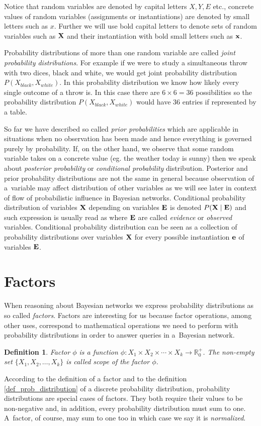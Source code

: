 \documentclass[english,cover]{fitthesis} %
\newtheorem{math_def}{Definition}[chapter] %
\newcommand{\term}[1]{\emph{#1}}           %
\newcommand{\vars}[1]{{\bold{#1}}}         %
\begin{document}
Notice that random variables are denoted by capital letters $X, Y, E$ etc., concrete values of random variables (assignments or instantiations) are denoted by small letters such as $x$. Further we will use bold capital letters to denote sets of random variables such as $\vars{X}$ and their instantiation with bold small letters such as $\vars{x}$.

Probability distributions of more than one random variable are called \term{joint probability distributions}. For example if we were to study a simultaneous throw with two dices, black and white, we would get joint probability distribution $P(X_{black},X_{white})$. In this probability distribution we know how likely every single outcome of a throw is. In this case there are $6 \times 6 = 36$ possibilities so the probability distribution $P(X_{black},X_{white})$ would have 36 entries if represented by a table.

So far we have described so called \term{prior probabilities} which are applicable in situations when no observation has been made and hence everything is governed purely by probability. If, on the other hand, we observe that some random variable takes on a concrete value (eg. the weather today is sunny) then we speak about \term{posterior probability} or \term{conditional probability} distribution.
Posterior and prior probability distributions are not the same in general because observation of a~variable may affect distribution of other variables as we will see later in context of flow of probabilistic influence in Bayesian networks.
Conditional probability distribution of variables $\vars{X}$ depending on variables $\vars{E}$ is denoted $P(\vars{X}\mid\vars{E})$ and such expression is usually read as \uv{probability of $\vars{X}$ given $\vars{E}$} where $\vars{E}$ are called \term{evidence} or \term{observed} variables. Conditional probability distribution can be seen as a collection of probability distributions over variables $\vars{X}$ for every possible instantiation $\vars{e}$ of variables $\vars{E}$.


\section{Factors}
When reasoning about Bayesian networks we express probability distributions as so called \term{factors}. Factors are interesting for us because factor operations, among other uses, correspond to mathematical operations we need to perform with probability distributions in order to answer queries in a~Bayesian network.
\begin{math_def}\label{def_factor}
    Factor $\phi$ is a function $\phi: X_1 \times X_2 \times \dotsm \times X_k \rightarrow \mathbb{R}_0^+$. The non-empty set $\lbrace X_1, X_2, \dots, X_k \rbrace$ is called scope of the factor $\phi$.
\end{math_def}
According to the definition of a factor and to the definition \ref{def_prob_distribution} of a discrete probability distribution, probability distributions are special cases of factors. They both require their values to be non-negative and, in addition, every probability distribution must sum to one. A~factor, of course, may sum to one too in which case we say it is \term{normalized}.
\end{document}
